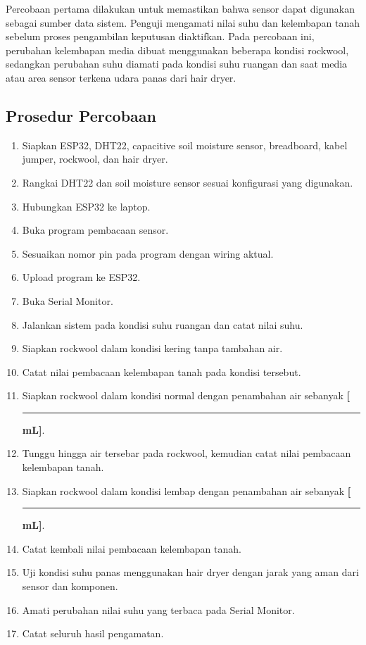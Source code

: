 \documentclass[12pt,a4paper]{article}
\begin{document}
Percobaan pertama dilakukan untuk memastikan bahwa sensor dapat digunakan sebagai sumber data sistem. Penguji mengamati nilai suhu dan kelembapan tanah sebelum proses pengambilan keputusan diaktifkan. Pada percobaan ini, perubahan kelembapan media dibuat menggunakan beberapa kondisi rockwool, sedangkan perubahan suhu diamati pada kondisi suhu ruangan dan saat media atau area sensor terkena udara panas dari hair dryer.

\subsection{Prosedur Percobaan}

\begin{enumerate}
    \item Siapkan ESP32, DHT22, capacitive soil moisture sensor, breadboard, kabel jumper, rockwool, dan hair dryer.
    \item Rangkai DHT22 dan soil moisture sensor sesuai konfigurasi yang digunakan.
    \item Hubungkan ESP32 ke laptop.
    \item Buka program pembacaan sensor.
    \item Sesuaikan nomor pin pada program dengan wiring aktual.
    \item Upload program ke ESP32.
    \item Buka Serial Monitor.
    \item Jalankan sistem pada kondisi suhu ruangan dan catat nilai suhu.
    \item Siapkan rockwool dalam kondisi kering tanpa tambahan air.
    \item Catat nilai pembacaan kelembapan tanah pada kondisi tersebut.
    \item Siapkan rockwool dalam kondisi normal dengan penambahan air sebanyak \textbf{[}\rule{1cm}{0.4pt}\textbf{ mL]}.
    \item Tunggu hingga air tersebar pada rockwool, kemudian catat nilai pembacaan kelembapan tanah.
    \item Siapkan rockwool dalam kondisi lembap dengan penambahan air sebanyak \textbf{[}\rule{1cm}{0.4pt}\textbf{ mL]}.
    \item Catat kembali nilai pembacaan kelembapan tanah.
    \item Uji kondisi suhu panas menggunakan hair dryer dengan jarak yang aman dari sensor dan komponen.
    \item Amati perubahan nilai suhu yang terbaca pada Serial Monitor.
    \item Catat seluruh hasil pengamatan.
\end{enumerate}
\end{document}
